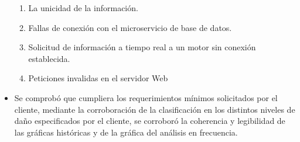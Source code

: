 \begin{itemize}
        \begin{enumerate}
            \item La unicidad de la información.
            \item Fallas de conexión con el microservicio de base de datos.
            \item Solicitud de información a tiempo real a un motor sin conexión
                establecida.
            \item Peticiones invalidas en el servidor Web
        \end{enumerate}
    \item Se comprobó que cumpliera
        los requerimientos mínimos solicitados por el cliente, mediante la
        corroboración de la clasificación en los distintos niveles de daño
        especificados por el cliente, se corroboró la coherencia y legibilidad
        de las gráficas históricas y de la gráfica del análisis en frecuencia.
\end{itemize}



